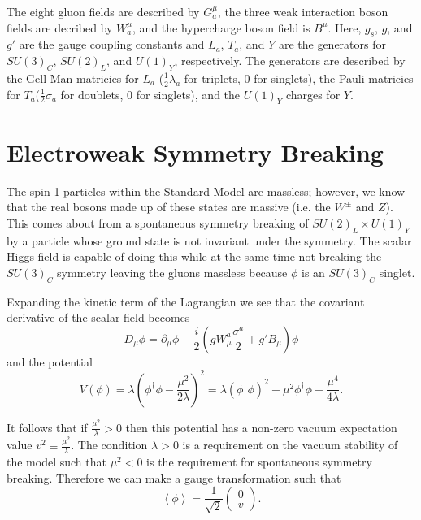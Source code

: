 The eight gluon fields are described by $G^{\mu}_a$, the three weak interaction boson fields are decribed by $W^{\mu}_a$, and the hypercharge boson field is $B^{\mu}$.  Here, $g_s$, $g$, and $g'$ are the gauge coupling constants and $L_a$, $T_a$, and $Y$ are the generators for $SU(3)_C$, $SU(2)_L$, and $U(1)_Y$, respectively.   The generators are described by the Gell-Man matricies for $L_a$ ($\frac{1}{2}\lambda_a$ for triplets, 0 for singlets), the Pauli matricies for $T_a$($\frac{1}{2}\sigma_a$ for doublets, 0 for singlets), and the $U(1)_Y$ charges for $Y$.



\section{Electroweak Symmetry Breaking}
\label{sec:EWSB}
  The spin-1 particles within the Standard Model are massless; however, we know that the real bosons made up of these states are massive (i.e. the $W^\pm$ and $Z$).  This comes about from a spontaneous symmetry breaking of $SU(2)_L \times U(1)_Y$ by a particle whose ground state is not invariant under the symmetry.  The scalar Higgs field is capable of doing this while at the same time not breaking the $SU(3)_C$ symmetry leaving the gluons massless because $\phi$ is an $SU(3)_C$ singlet.

Expanding the kinetic term of the Lagrangian we see that the covariant derivative of the scalar field becomes
\[ D_{\mu} \phi = \partial_\mu \phi - \frac{i}{2}(gW_{\mu}^{a} \frac{\sigma^a}{2}+g' B_\mu)\phi
\]
and the potential
\[ V(\phi) = \lambda (\phi^{\dagger} \phi - \frac{\mu^2}{2 \lambda})^2 = \lambda(\phi^\dagger \phi)^2 -\mu^2 \phi^\dagger \phi + \frac{\mu^4}{4\lambda}.
\]

It follows that if $\frac{\mu^2}{\lambda}>0$ then this potential has a non-zero vacuum expectation value $v^2 \equiv \frac{\mu^2}{\lambda}$.  The condition $\lambda>0$ is a requirement on the vacuum stability of the model such that $\mu^2 <0$ is the requirement for spontaneous symmetry breaking.  Therefore we can make a gauge transformation such that 
\[ \left<{\phi}\right>=\frac{1}{\sqrt{2}}\begin{pmatrix} 0\\v\end{pmatrix}.
\]

